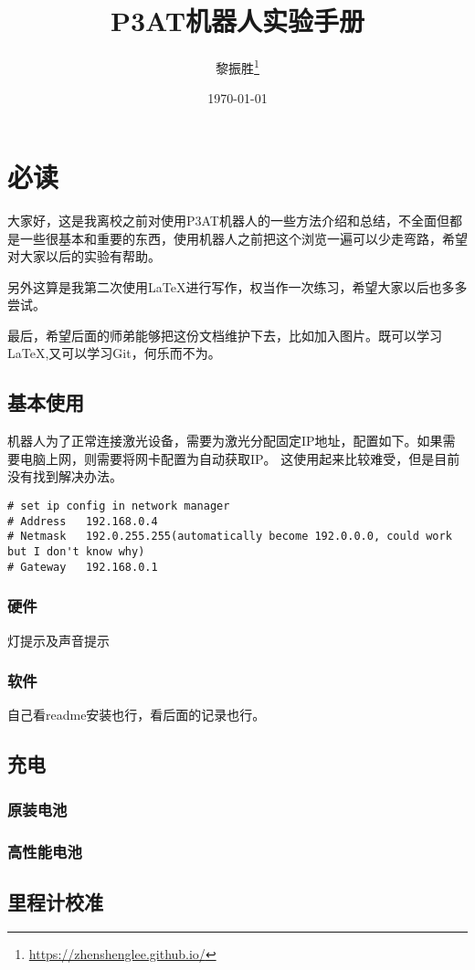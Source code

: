 \documentclass[a4paper,twoside,cs4size,fancyhdr,notitlepage]{ctexart}
\title{P3AT机器人实验手册}
\author{黎振胜\footnote{\url{https://zhenshenglee.github.io/}}}
\date{\today}
\begin{document}
\maketitle{}

\section{必读}
大家好，这是我离校之前对使用P3AT机器人的一些方法介绍和总结，不全面但都是一些很基本和重要的东西，使用机器人之前把这个浏览一遍可以少走弯路，希望对大家以后的实验有帮助。

另外这算是我第二次使用\LaTeX 进行写作，权当作一次练习，希望大家以后也多多尝试。

最后，希望后面的师弟能够把这份文档维护下去，比如加入图片。既可以学习\LaTeX ,又可以学习Git，何乐而不为。

\subsection{基本使用}
机器人为了正常连接激光设备，需要为激光分配固定IP地址，配置如下。如果需要电脑上网，则需要将网卡配置为自动获取IP。
这使用起来比较难受，但是目前没有找到解决办法。
\begin{lstlisting}
# set ip config in network manager
# Address	192.168.0.4
# Netmask	192.0.255.255(automatically become 192.0.0.0, could work but I don't know why)
# Gateway	192.168.0.1
\end{lstlisting}
\subsubsection{硬件}
灯提示及声音提示
\subsubsection{软件}
自己看readme安装也行，看后面的记录也行。
\subsection{充电}
\subsubsection{原装电池}
\subsubsection{高性能电池}
\subsection{里程计校准}
\end{document}

